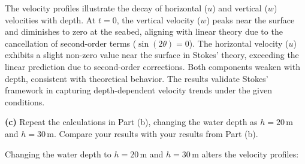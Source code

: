 \documentclass[a4paper]{article}
\begin{document}
The velocity profiles illustrate the decay of horizontal (\(u\)) and vertical (\(w\)) velocities with depth. At \(t = 0\), the vertical velocity (\(w\)) peaks near the surface and diminishes to zero at the seabed, aligning with linear theory due to the cancellation of second-order terms (\(\sin(2\theta) = 0\)). The horizontal velocity (\(u\)) exhibits a slight non-zero value near the surface in Stokes' theory, exceeding the linear prediction due to second-order corrections. Both components weaken with depth, consistent with theoretical behavior. The results validate Stokes' framework in capturing depth-dependent velocity trends under the given conditions.  
\vspace{0.3cm}

\textbf{(c)} Repeat the calculations in Part (b), changing the water depth as \( h = 20 \, \text{m} \) and \( h = 30 \, \text{m} \). Compare your results with your results from Part (b).
\vspace{0.3cm}


Changing the water depth to \( h = 20 \, \text{m} \) and \( h = 30 \, \text{m} \) alters the velocity profiles:  
\end{document}
